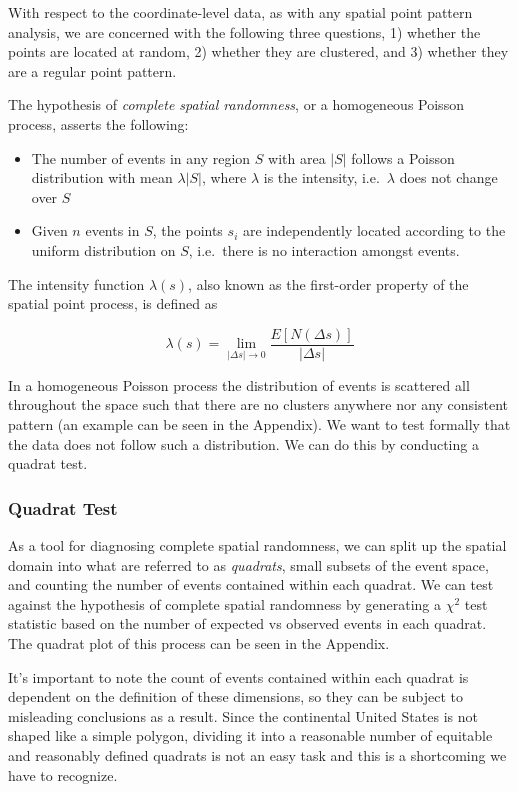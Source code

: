 \documentclass[
  12pt,
]{article}
\providecommand{\tightlist}{%
  \setlength{\itemsep}{0pt}\setlength{\parskip}{0pt}}
\begin{document}
With respect to the coordinate-level data, as with any spatial point
pattern analysis, we are concerned with the following three questions,
1) whether the points are located at random, 2) whether they are
clustered, and 3) whether they are a regular point pattern.

The hypothesis of \emph{complete spatial randomness}, or a homogeneous
Poisson process, asserts the following:

\begin{itemize}
\tightlist
\item
  The number of events in any region \(S\) with area \(|S|\) follows a
  Poisson distribution with mean \(\lambda |S|\), where \(\lambda\) is
  the intensity, i.e.~\(\lambda\) does not change over \(S\)
\item
  Given \(n\) events in \(S\), the points \(s_i\) are independently
  located according to the uniform distribution on \(S\), i.e.~there is
  no interaction amongst events.
\end{itemize}

The intensity function \(\lambda(s)\), also known as the first-order
property of the spatial point process, is defined as

\[\lambda(s) = \lim_{|\Delta s| \to 0} \frac{E[N(\Delta s)]}{| \Delta s|}\]

In a homogeneous Poisson process the distribution of events is scattered
all throughout the space such that there are no clusters anywhere nor
any consistent pattern (an example can be seen in the Appendix). We want
to test formally that the data does not follow such a distribution. We
can do this by conducting a quadrat test.

\hypertarget{quadrat-test}{%
\subsubsection{Quadrat Test}\label{quadrat-test}}

As a tool for diagnosing complete spatial randomness, we can split up
the spatial domain into what are referred to as \emph{quadrats}, small
subsets of the event space, and counting the number of events contained
within each quadrat. We can test against the hypothesis of complete
spatial randomness by generating a \(\chi^2\) test statistic based on
the number of expected vs observed events in each quadrat. The quadrat
plot of this process can be seen in the Appendix.

It's important to note the count of events contained within each quadrat
is dependent on the definition of these dimensions, so they can be
subject to misleading conclusions as a result. Since the continental
United States is not shaped like a simple polygon, dividing it into a
reasonable number of equitable and reasonably defined quadrats is not an
easy task and this is a shortcoming we have to recognize.
\end{document}

